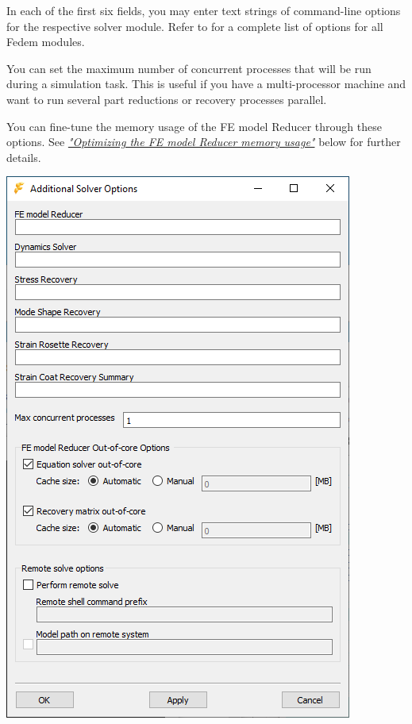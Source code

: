 {\noindent
\begin{minipage}{0.5\textwidth}
  \raggedright
  \begin{bulletlist}
    \setlength\itemsep{1mm}
  \item
    In each of the first six fields, you may enter text strings of
    command-line options for the respective solver module. Refer to
    for a complete list of options for all Fedem modules.
  \item
    You can set the maximum number of concurrent processes that will be run
    during a simulation task. This is useful if you have a multi-processor
    machine and want to run several part reductions or recovery processes
    parallel.
  \item
    You can fine-tune the memory usage of the FE model Reducer through
    these options. See
    \protect\hyperlink{optimizing-the-fe-model-reducer-memory-usage}
                      {\sl"Optimizing the FE model Reducer memory usage"}
    below for further details.
  \end{bulletlist}
\end{minipage}%
\hfill\begin{minipage}{0.48\textwidth}
  \includegraphics[width=\textwidth]{Figures/Dialogs/6-AdditionalSolverOptions}

\end{minipage}}
